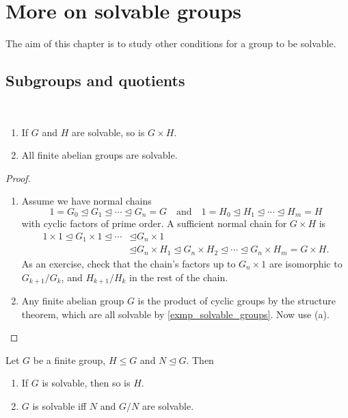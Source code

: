 \chapter{More on solvable groups}

The aim of this chapter is to study other conditions for a group to be solvable.

\section{Subgroups and quotients}

\begin{proposition}~
    \begin{enumerate}[label=(\alph*)]
        \item If $G$ and $H$ are solvable, so is $G \times H$.
        \item All finite abelian groups are solvable.
    \end{enumerate}
\end{proposition}

\begin{proof}~
    \begin{enumerate}[label=(\alph*)]
        \item Assume we have normal chains
        \[
            1 = G_0 \unlhd G_1 \unlhd \cdots \unlhd G_n = G
            \quad \text{and} \quad
            1 = H_0 \unlhd H_1 \unlhd \cdots \unlhd H_m = H
        \]
        with cyclic factors of prime order. A sufficient normal chain for $G \times H$ is
        \begin{align*}
            1 \times 1 \unlhd G_1 \times 1 \unlhd \cdots &\unlhd G_n \times 1 \\
            &\unlhd G_n \times H_1 \unlhd G_n \times H_2 \unlhd \cdots \unlhd G_n \times H_m = G \times H.
        \end{align*}
        As an exercise, check that the chain's factors up to $G_n \times 1$ are isomorphic to $G_{k + 1}/G_k$, and $H_{k + 1}/H_k$ in the rest of the chain.
        
        \item Any finite abelian group $G$ is the product of cyclic groups by the structure theorem, which are all solvable by \cref{exmp_solvable_groups}. Now use (a). \qedhere
    \end{enumerate}
\end{proof}

\begin{proposition}
\label{prop_solvability_of_subgroups_and_quots}
    Let $G$ be a finite group, $H \leq G$ and $N \unlhd G$. Then
    \begin{enumerate}[label=(\alph*)]
        \item If $G$ is solvable, then so is $H$.
        \item $G$ is solvable iff $N$ and $G/N$ are solvable.
    \end{enumerate}
\end{proposition}


